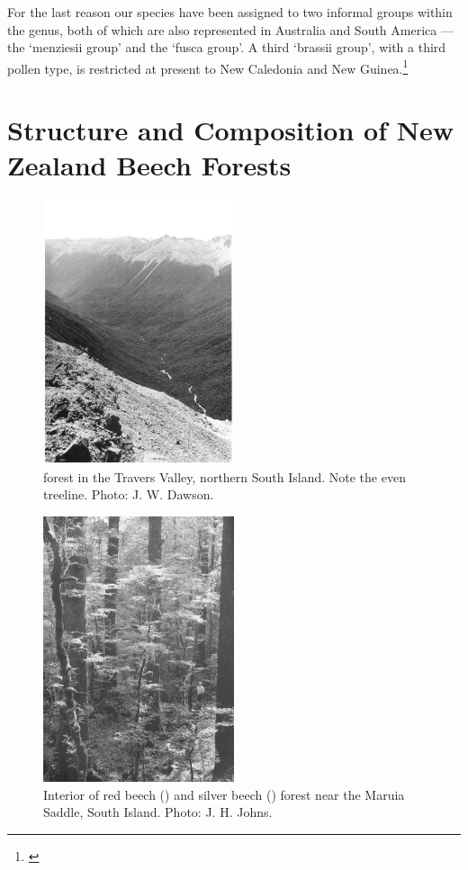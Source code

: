 For the last reason our species have been assigned to two informal groups within the genus, both of which are also represented in Australia and South America --- the `menziesii group' and the `fusca group'.
A third `brassii group', with a third pollen type, is restricted at present to New Caledonia and New Guinea.\footnote{\cite{cranwell1939southern}}

\section{Structure and Composition of New Zealand Beech Forests}

\begin{figure}
	\includegraphics[width=0.5\textwidth]{graphics/figure71nothofagus-forest.jpg}
	\centering
	\caption[Nothofagus forest in the Travers Valley]{ forest in the Travers Valley, northern South Island.
	Note the even treeline.
	Photo: J. W. Dawson.}%
	\label{fig:71nothofagus-forest}
\end{figure}

\begin{figure}
	\includegraphics[width=0.5\textwidth]{graphics/figure72beech.jpg}
	\centering
	\caption[Interior of red beech and silver beech forest]{Interior of red beech () and silver beech () forest near the Maruia Saddle, South Island.
	Photo: J. H. Johns.}%
	\label{fig:72beech}
\end{figure}

